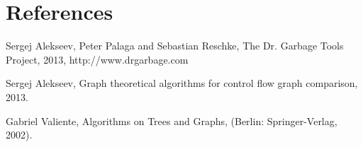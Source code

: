 \chapter{References}
\label{cha:References} 

\begin{thebibliography}{1}

  Sergej Alekseev, Peter Palaga and Sebastian Reschke, The Dr. Garbage Tools Project, 2013,
http://www.drgarbage.com

  Sergej Alekseev, Graph theoretical algorithms for control flow graph comparison, 2013.
 
 
 Gabriel Valiente, Algorithms on Trees and Graphs,
(Berlin: Springer-Verlag, 2002).

 \end{thebibliography}
  